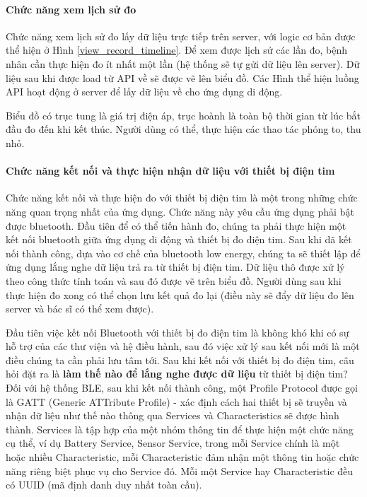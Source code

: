 \paragraph{Chức năng xem lịch sử đo}
\mbox{}

Chức năng xem lịch sử đo lấy dữ liệu trực tiếp trên server, với logic cơ bản được thể hiện ở Hình \ref{view_record_timeline}. 
Để xem được lịch sử các lần đo, bệnh nhân cần thực hiện đo ít nhất một lần (hệ thống sẽ tự gửi dữ liệu lên server). Dữ liệu sau khi được
load từ API về sẽ được vẽ lên biểu đồ. Các Hình thể hiện luồng API hoạt động ở server để lấy dữ liệu về cho ứng dụng di động.


Biểu đồ có trục tung là giá trị điện áp, trục hoành là toàn bộ thời gian từ lúc bắt đầu đo đến khi kết thúc. Người dùng có thể,
thực hiện các thao tác phóng to, thu nhỏ.

\paragraph{Chức năng kết nối và thực hiện nhận dữ liệu với thiết bị điện tim}
\mbox{}

Chức năng kết nối và thực hiện đo với thiết bị điện tim là một trong những chức năng quan trọng nhất của ứng dụng. Chức năng này yêu cầu
ứng dụng phải bật được bluetooth. Đầu tiên để có thể tiến hành đo, chúng ta phải thực hiện một kết nối bluetooth giữa ứng dụng di động và
thiết bị đo điện tim. Sau khi dã kết nối thành công, dựa vào cơ chế của bluetooth low energy, chúng ta sẽ thiết lập để ứng dụng lắng
nghe dữ liệu trả ra từ thiết bị điện tim. Dữ liệu thô được xử lý theo công thức tính toán và sau đó được vẽ trên biểu đồ. Người dùng sau
khi thực hiện đo xong có thể chọn lưu kết quả đo lại (điều này sẽ đẩy dữ liệu đo lên server và bác sĩ có thể xem được).

Đầu tiên việc kết nối Bluetooth với thiết bị đo điện tim là không khó khi có sự hỗ trợ của các thư viện và hệ điều hành, sau đó việc xử lý sau
kết nối mới là một điều chúng ta cần phải lưu tâm tới. Sau khi kết nối với thiết bị đo điện tim, câu hỏi đặt ra là \textbf{làm thế nào
để lắng nghe được dữ liệu} từ thiết bị điện tim? Đối với hệ thống BLE, sau khi kết nối thành công, một Profile Protocol được gọi
là GATT (Generic ATTribute Profile) - xác định cách hai thiết bị sẽ truyền và nhận dữ liệu như thế nào thông qua
Services và Characteristics sẽ được hình thành. 
Services là tập hợp của một nhóm thông tin để thực hiện một chức năng cụ thể,
ví dụ Battery Service, Sensor Service, trong mỗi Service chính là một hoặc nhiều Characteristic, mỗi Characteristic đảm nhận
một thông tin hoặc chức năng riêng biệt phục vụ cho Service đó. Mỗi một Service hay Characteristic đều có UUID (mã định danh duy nhất toàn cầu).

